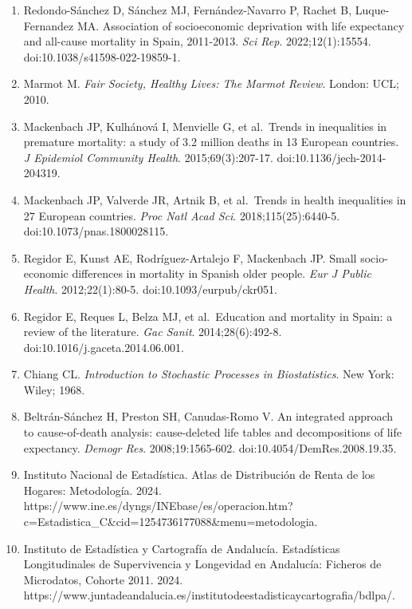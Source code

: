 \documentclass[
  11pt,
  a4paper,
]{article}
\begin{document}
\begin{enumerate}
\def\labelenumi{\arabic{enumi}.}
\item
  Redondo-Sánchez D, Sánchez MJ, Fernández-Navarro P, Rachet B,
  Luque-Fernandez MA. Association of socioeconomic deprivation with life
  expectancy and all-cause mortality in Spain, 2011-2013. \emph{Sci
  Rep}. 2022;12(1):15554. doi:10.1038/s41598-022-19859-1.
\item
  Marmot M. \emph{Fair Society, Healthy Lives: The Marmot Review}.
  London: UCL; 2010.
\item
  Mackenbach JP, Kulhánová I, Menvielle G, et al.~Trends in inequalities
  in premature mortality: a study of 3.2 million deaths in 13 European
  countries. \emph{J Epidemiol Community Health}. 2015;69(3):207-17.
  doi:10.1136/jech-2014-204319.
\item
  Mackenbach JP, Valverde JR, Artnik B, et al.~Trends in health
  inequalities in 27 European countries. \emph{Proc Natl Acad Sci}.
  2018;115(25):6440-5. doi:10.1073/pnas.1800028115.
\item
  Regidor E, Kunst AE, Rodríguez-Artalejo F, Mackenbach JP. Small
  socio-economic differences in mortality in Spanish older people.
  \emph{Eur J Public Health}. 2012;22(1):80-5.
  doi:10.1093/eurpub/ckr051.
\item
  Regidor E, Reques L, Belza MJ, et al.~Education and mortality in
  Spain: a review of the literature. \emph{Gac Sanit}. 2014;28(6):492-8.
  doi:10.1016/j.gaceta.2014.06.001.
\item
  Chiang CL. \emph{Introduction to Stochastic Processes in
  Biostatistics}. New York: Wiley; 1968.
\item
  Beltrán-Sánchez H, Preston SH, Canudas-Romo V. An integrated approach
  to cause-of-death analysis: cause-deleted life tables and
  decompositions of life expectancy. \emph{Demogr Res}.
  2008;19:1565-602. doi:10.4054/DemRes.2008.19.35.
\item
  Instituto Nacional de Estadística. Atlas de Distribución de Renta de
  los Hogares: Metodología. 2024.
  https://www.ine.es/dyngs/INEbase/es/operacion.htm?c=Estadistica\_C\&cid=1254736177088\&menu=metodologia.
\item
  Instituto de Estadística y Cartografía de Andalucía. Estadísticas
  Longitudinales de Supervivencia y Longevidad en Andalucía: Ficheros de
  Microdatos, Cohorte 2011. 2024.
  https://www.juntadeandalucia.es/institutodeestadisticaycartografia/bdlpa/.
\end{enumerate}
\end{document}
